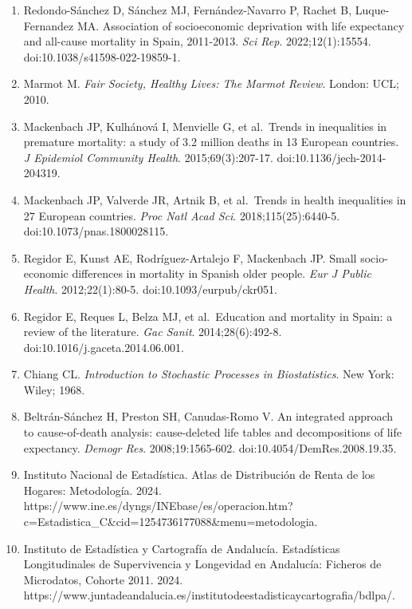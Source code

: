 \documentclass[
  11pt,
  a4paper,
]{article}
\begin{document}
\begin{enumerate}
\def\labelenumi{\arabic{enumi}.}
\item
  Redondo-Sánchez D, Sánchez MJ, Fernández-Navarro P, Rachet B,
  Luque-Fernandez MA. Association of socioeconomic deprivation with life
  expectancy and all-cause mortality in Spain, 2011-2013. \emph{Sci
  Rep}. 2022;12(1):15554. doi:10.1038/s41598-022-19859-1.
\item
  Marmot M. \emph{Fair Society, Healthy Lives: The Marmot Review}.
  London: UCL; 2010.
\item
  Mackenbach JP, Kulhánová I, Menvielle G, et al.~Trends in inequalities
  in premature mortality: a study of 3.2 million deaths in 13 European
  countries. \emph{J Epidemiol Community Health}. 2015;69(3):207-17.
  doi:10.1136/jech-2014-204319.
\item
  Mackenbach JP, Valverde JR, Artnik B, et al.~Trends in health
  inequalities in 27 European countries. \emph{Proc Natl Acad Sci}.
  2018;115(25):6440-5. doi:10.1073/pnas.1800028115.
\item
  Regidor E, Kunst AE, Rodríguez-Artalejo F, Mackenbach JP. Small
  socio-economic differences in mortality in Spanish older people.
  \emph{Eur J Public Health}. 2012;22(1):80-5.
  doi:10.1093/eurpub/ckr051.
\item
  Regidor E, Reques L, Belza MJ, et al.~Education and mortality in
  Spain: a review of the literature. \emph{Gac Sanit}. 2014;28(6):492-8.
  doi:10.1016/j.gaceta.2014.06.001.
\item
  Chiang CL. \emph{Introduction to Stochastic Processes in
  Biostatistics}. New York: Wiley; 1968.
\item
  Beltrán-Sánchez H, Preston SH, Canudas-Romo V. An integrated approach
  to cause-of-death analysis: cause-deleted life tables and
  decompositions of life expectancy. \emph{Demogr Res}.
  2008;19:1565-602. doi:10.4054/DemRes.2008.19.35.
\item
  Instituto Nacional de Estadística. Atlas de Distribución de Renta de
  los Hogares: Metodología. 2024.
  https://www.ine.es/dyngs/INEbase/es/operacion.htm?c=Estadistica\_C\&cid=1254736177088\&menu=metodologia.
\item
  Instituto de Estadística y Cartografía de Andalucía. Estadísticas
  Longitudinales de Supervivencia y Longevidad en Andalucía: Ficheros de
  Microdatos, Cohorte 2011. 2024.
  https://www.juntadeandalucia.es/institutodeestadisticaycartografia/bdlpa/.
\end{enumerate}
\end{document}
